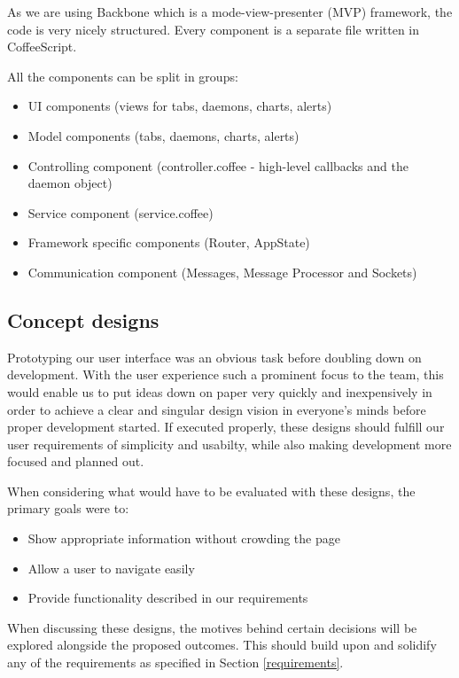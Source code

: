 \documentclass{l3proj}
\begin{document}
As we are using Backbone which is a mode-view-presenter (MVP) framework, the code is very nicely structured. Every component is a separate file written in CoffeeScript.

All the components can be split in groups:
\begin{itemize}
  \item UI components (views for tabs, daemons, charts, alerts)
  \item Model components (tabs, daemons, charts, alerts)
  \item Controlling component (controller.coffee - high-level callbacks and the daemon object)
  \item Service component (service.coffee)
  \item Framework specific components (Router, AppState)
  \item Communication component (Messages, Message Processor and Sockets)
\end{itemize}

\subsection{Concept designs}

Prototyping our user interface was an obvious task before doubling down on development. With the user experience such a prominent focus to the team, this would enable us to put ideas down on paper very quickly and inexpensively in order to achieve a clear and singular design vision in everyone's minds before proper development started. If executed properly, these designs should fulfill our user requirements of simplicity and usabilty, while also making development more focused and planned out.

When considering what would have to be evaluated with these designs, the primary goals were to:

\begin{itemize}
\item{Show appropriate information without crowding the page}
\item{Allow a user to navigate easily}
\item{Provide functionality described in our requirements}
\end{itemize}

When discussing these designs, the motives behind certain decisions will be explored alongside the proposed outcomes. This should build upon and solidify any of the requirements as specified in Section \ref{requirements}.
\end{document}
